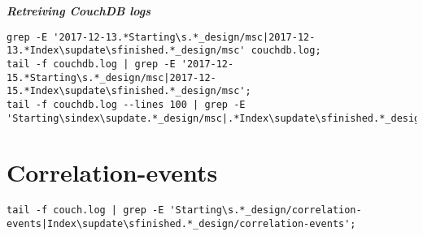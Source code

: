 \textit{\textbf{Retreiving CouchDB logs}}
\begin{verbatim}
grep -E '2017-12-13.*Starting\s.*_design/msc|2017-12-13.*Index\supdate\sfinished.*_design/msc' couchdb.log;
tail -f couchdb.log | grep -E '2017-12-15.*Starting\s.*_design/msc|2017-12-15.*Index\supdate\sfinished.*_design/msc';
tail -f couchdb.log --lines 100 | grep -E 'Starting\sindex\supdate.*_design/msc|.*Index\supdate\sfinished.*_design/msc'
\end{verbatim}

\section{Correlation-events}
\begin{verbatim}
tail -f couch.log | grep -E 'Starting\s.*_design/correlation-events|Index\supdate\sfinished.*_design/correlation-events';
\end{verbatim}

